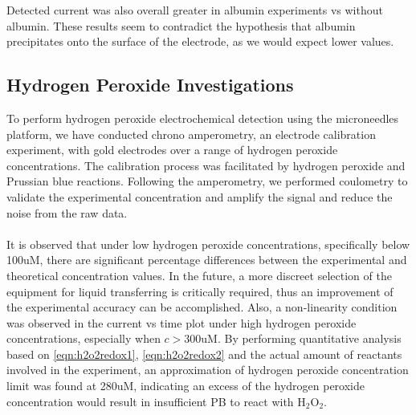 Detected current was also overall greater in albumin experiments vs without albumin. These results seem to contradict the hypothesis that albumin precipitates onto the surface of the electrode, as we would expect lower values. 


\subsection{Hydrogen Peroxide Investigations}
To perform hydrogen peroxide electrochemical detection using the microneedles platform, we have conducted chrono amperometry, an electrode calibration experiment, with gold electrodes over a range of hydrogen peroxide concentrations. The calibration process was facilitated by hydrogen peroxide and Prussian blue reactions. Following the amperometry, we performed coulometry to validate the experimental concentration and amplify the signal and reduce the noise from the raw data. \\\\It is observed that under low hydrogen peroxide concentrations, specifically below 100uM, there are significant percentage differences between the experimental and theoretical concentration values. In the future, a more discreet selection of the equipment for liquid transferring is critically required, thus an improvement of the experimental accuracy can be accomplished. Also, a non-linearity condition was observed in the current vs time plot under high hydrogen peroxide concentrations, especially when $c>300$uM. By performing quantitative analysis based on \autoref{eqn:h2o2redox1},  \autoref{eqn:h2o2redox2} and the actual amount of reactants involved in the experiment, an approximation of hydrogen peroxide concentration limit was found at 280uM, indicating an excess of the hydrogen peroxide concentration would result in insufficient PB to react with H$_{\text{2}}$O$_{\text{2}}$. 



